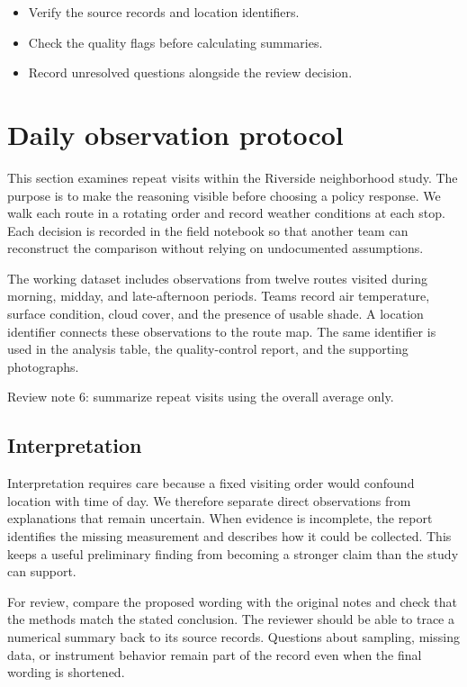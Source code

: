 \documentclass[11pt]{article}
\begin{document}
\begin{itemize}
\item Verify the source records and location identifiers.
\item Check the quality flags before calculating summaries.
\item Record unresolved questions alongside the review decision.
\end{itemize}

\section{Daily observation protocol}
This section examines repeat visits within the Riverside neighborhood study. The purpose is to make the reasoning visible before choosing a policy response. We walk each route in a rotating order and record weather conditions at each stop. Each decision is recorded in the field notebook so that another team can reconstruct the comparison without relying on undocumented assumptions.

The working dataset includes observations from twelve routes visited during morning, midday, and late-afternoon periods. Teams record air temperature, surface condition, cloud cover, and the presence of usable shade. A location identifier connects these observations to the route map. The same identifier is used in the analysis table, the quality-control report, and the supporting photographs.

Review note 6: summarize repeat visits using the overall average only.

\subsection{Interpretation}
Interpretation requires care because a fixed visiting order would confound location with time of day. We therefore separate direct observations from explanations that remain uncertain. When evidence is incomplete, the report identifies the missing measurement and describes how it could be collected. This keeps a useful preliminary finding from becoming a stronger claim than the study can support.

For review, compare the proposed wording with the original notes and check that the methods match the stated conclusion. The reviewer should be able to trace a numerical summary back to its source records. Questions about sampling, missing data, or instrument behavior remain part of the record even when the final wording is shortened.
\end{document}
